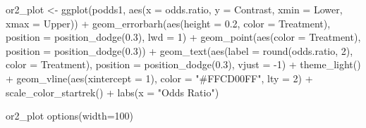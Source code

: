 \documentclass[12pt]{article}
\newenvironment{Shaded}{\begin{snugshade}}{\end{snugshade}}
\newcommand{\AttributeTok}[1]{\textcolor[rgb]{0.77,0.63,0.00}{#1}}
\newcommand{\DecValTok}[1]{\textcolor[rgb]{0.00,0.00,0.81}{#1}}
\newcommand{\FloatTok}[1]{\textcolor[rgb]{0.00,0.00,0.81}{#1}}
\newcommand{\FunctionTok}[1]{\textcolor[rgb]{0.00,0.00,0.00}{#1}}
\newcommand{\NormalTok}[1]{#1}
\newcommand{\OtherTok}[1]{\textcolor[rgb]{0.56,0.35,0.01}{#1}}
\newcommand{\SpecialCharTok}[1]{\textcolor[rgb]{0.00,0.00,0.00}{#1}}
\newcommand{\StringTok}[1]{\textcolor[rgb]{0.31,0.60,0.02}{#1}}
\begin{document}
\begin{Shaded}
\begin{Highlighting}[]
\NormalTok{or2\_plot }\OtherTok{\textless{}{-}} \FunctionTok{ggplot}\NormalTok{(podds1, }\FunctionTok{aes}\NormalTok{(}\AttributeTok{x =}\NormalTok{ odds.ratio, }\AttributeTok{y =}\NormalTok{ Contrast, }\AttributeTok{xmin =}\NormalTok{ Lower, }\AttributeTok{xmax =}\NormalTok{ Upper)) }\SpecialCharTok{+}
  \FunctionTok{geom\_errorbarh}\NormalTok{(}\FunctionTok{aes}\NormalTok{(}\AttributeTok{height =} \FloatTok{0.2}\NormalTok{, }\AttributeTok{color =}\NormalTok{ Treatment),}
                 \AttributeTok{position =} \FunctionTok{position\_dodge}\NormalTok{(}\FloatTok{0.3}\NormalTok{), }\AttributeTok{lwd =} \DecValTok{1}\NormalTok{) }\SpecialCharTok{+}
  \FunctionTok{geom\_point}\NormalTok{(}\FunctionTok{aes}\NormalTok{(}\AttributeTok{color =}\NormalTok{ Treatment), }\AttributeTok{position =} \FunctionTok{position\_dodge}\NormalTok{(}\FloatTok{0.3}\NormalTok{)) }\SpecialCharTok{+}
  \FunctionTok{geom\_text}\NormalTok{(}\FunctionTok{aes}\NormalTok{(}\AttributeTok{label =} \FunctionTok{round}\NormalTok{(odds.ratio, }\DecValTok{2}\NormalTok{), }\AttributeTok{color =}\NormalTok{ Treatment), }
            \AttributeTok{position =} \FunctionTok{position\_dodge}\NormalTok{(}\FloatTok{0.3}\NormalTok{), }\AttributeTok{vjust =} \SpecialCharTok{{-}}\DecValTok{1}\NormalTok{) }\SpecialCharTok{+}
  \FunctionTok{theme\_light}\NormalTok{() }\SpecialCharTok{+}
  \FunctionTok{geom\_vline}\NormalTok{(}\FunctionTok{aes}\NormalTok{(}\AttributeTok{xintercept =} \DecValTok{1}\NormalTok{), }\AttributeTok{color =} \StringTok{"\#FFCD00FF"}\NormalTok{, }\AttributeTok{lty =} \DecValTok{2}\NormalTok{) }\SpecialCharTok{+}
  \FunctionTok{scale\_color\_startrek}\NormalTok{() }\SpecialCharTok{+}
  \FunctionTok{labs}\NormalTok{(}\AttributeTok{x =} \StringTok{"Odds Ratio"}\NormalTok{)}

\NormalTok{or2\_plot}
\FunctionTok{options}\NormalTok{(}\AttributeTok{width=}\DecValTok{100}\NormalTok{)}
\end{Highlighting}
\end{Shaded}




\end{document}

